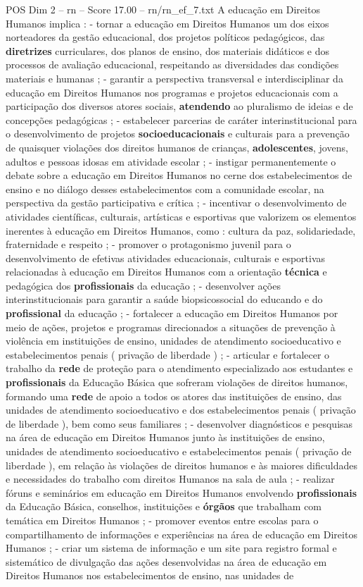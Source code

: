\begin{textsample}{POS Dim 2 – rn – Score 17.00 – rn/rn\_ef\_7.txt}
A educação em Direitos Humanos implica : - tornar a educação em Direitos Humanos um dos eixos norteadores da gestão educacional, dos projetos políticos pedagógicos, das \textbf{diretrizes} curriculares, dos planos de ensino, dos materiais didáticos e dos processos de avaliação educacional, respeitando as diversidades das condições materiais e humanas ; - garantir a perspectiva transversal e interdisciplinar da educação em Direitos Humanos nos programas e projetos educacionais com a participação dos diversos atores sociais, \textbf{atendendo} ao pluralismo de ideias e de concepções pedagógicas ; - estabelecer parcerias de caráter interinstitucional para o desenvolvimento de projetos \textbf{socioeducacionais} e culturais para a prevenção de quaisquer violações dos direitos humanos de crianças, \textbf{adolescentes}, jovens, adultos e pessoas idosas em atividade escolar ; - instigar permanentemente o debate sobre a educação em Direitos Humanos no cerne dos estabelecimentos de ensino e no diálogo desses estabelecimentos com a comunidade escolar, na perspectiva da gestão participativa e crítica ; - incentivar o desenvolvimento de atividades científicas, culturais, artísticas e esportivas que valorizem os elementos inerentes à educação em Direitos Humanos, como : cultura da paz, solidariedade, fraternidade e respeito ; - promover o protagonismo juvenil para o desenvolvimento de efetivas atividades educacionais, culturais e esportivas relacionadas à educação em Direitos Humanos com a orientação \textbf{técnica} e pedagógica dos \textbf{profissionais} da educação ; - desenvolver ações interinstitucionais para garantir a saúde biopsicossocial do educando e do \textbf{profissional} da educação ; - fortalecer a educação em Direitos Humanos por meio de ações, projetos e programas direcionados a situações de prevenção à violência em instituições de ensino, unidades de atendimento socioeducativo e estabelecimentos penais ( privação de liberdade ) ; - articular e fortalecer o trabalho da \textbf{rede} de proteção para o atendimento especializado aos estudantes e \textbf{profissionais} da Educação Básica que sofreram violações de direitos humanos, formando uma \textbf{rede} de apoio a todos os atores das instituições de ensino, das unidades de atendimento socioeducativo e dos estabelecimentos penais ( privação de liberdade ), bem como seus familiares ; - desenvolver diagnósticos e pesquisas na área de educação em Direitos Humanos junto às instituições de ensino, unidades de atendimento socioeducativo e estabelecimentos penais ( privação de liberdade ), em relação às violações de direitos humanos e às maiores dificuldades e necessidades do trabalho com direitos Humanos na sala de aula ; - realizar fóruns e seminários em educação em Direitos Humanos envolvendo \textbf{profissionais} da Educação Básica, conselhos, instituições e \textbf{órgãos} que trabalham com temática em Direitos Humanos ; - promover eventos entre escolas para o compartilhamento de informações e experiências na área de educação em Direitos Humanos ; - criar um sistema de informação e um site para registro formal e sistemático de divulgação das ações desenvolvidas na área de educação em Direitos Humanos nos estabelecimentos de ensino, nas unidades de 
\end{textsample}
